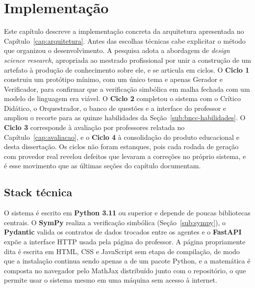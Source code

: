 \chapter{Implementação}
\label{cap:implementacao}

%

Este capítulo descreve a implementação concreta da arquitetura apresentada no
Capítulo~\ref{cap:arquitetura}. Antes das escolhas técnicas cabe explicitar o método que
organizou o desenvolvimento. A pesquisa adota a abordagem de \emph{design science research},
apropriada ao mestrado profissional por unir a construção de um artefato à produção de
conhecimento sobre ele, e se articula em ciclos. O \textbf{Ciclo 1} construiu um protótipo mínimo,
com um único tema e apenas Gerador e Verificador, para confirmar que a verificação simbólica em
malha fechada com um modelo de linguagem era viável. O \textbf{Ciclo 2} completou o sistema com o
Crítico Didático, o Orquestrador, o banco de questões e a interface do professor e ampliou o
recorte para as quinze habilidades da Seção~\ref{sub:bncc-habilidades}. O \textbf{Ciclo 3}
corresponde à avaliação por professores relatada no Capítulo~\ref{cap:avaliacao}, e o
\textbf{Ciclo 4} à consolidação do produto educacional e desta dissertação. Os ciclos não foram
estanques, pois cada rodada de geração com provedor real revelou defeitos que levaram a correções
no próprio sistema, e é esse movimento que as últimas seções do capítulo documentam.

\section{Stack técnica}
\label{sec:stack}

O sistema é escrito em \textbf{Python 3.11} ou superior e depende de poucas bibliotecas centrais.
O \textbf{SymPy} realiza a verificação simbólica (Seção~\ref{sub:sympy}), o \textbf{Pydantic}
valida os contratos de dados trocados entre os agentes e o \textbf{FastAPI} expõe a interface
HTTP usada pela página do professor. A página propriamente dita é escrita em HTML, CSS e
JavaScript sem etapa de compilação, de modo que a instalação continua sendo apenas a de um pacote
Python, e a matemática é composta no navegador pelo MathJax distribuído junto com o repositório,
o que permite usar o sistema mesmo em uma máquina sem acesso à internet.

